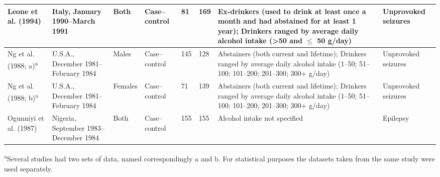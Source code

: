 \documentclass{article}
\begin{document}
\begin{table}
\begin{threeparttable}
\begin{tabular}{|p{2.5cm}|p{3cm}|p{1.5cm}|p{2cm}|p{1cm}|p{1cm}|p{7.5cm}|p{2cm}|}
    Leone et al. (1994) & Italy, January 1990--March 1991 & Both & Case--control & 81 & 169 & Ex-drinkers (used to drink at least once a month and had abstained for at least 1 year); Drinkers ranged by average daily alcohol intake (>50 and $\leq$ 50 g/day) & Unprovoked seizures \\ \hline
    Ng et al. (1988; a)\textsuperscript{a} & U.S.A., December 1981--February 1984 & Males & Case--control & 145 & 128 & Abstainers (both current and lifetime); Drinkers ranged by average daily alcohol intake (1--50; 51--100; 101--200; 201--300; 300+ g/day) & Unprovoked seizures \\ \hline
    Ng et al. (1988; b)\textsuperscript{a} & U.S.A., December 1981--February 1984 & Females & Case--control & 71 & 139 & Abstainers (both current and lifetime); Drinkers ranged by average daily alcohol intake (1--50; 51--100; 101--200; 201--300; 300+ g/day) & Unprovoked seizures \\ \hline
    Ogunniyi et al. (1987) & Nigeria, September 1983--December 1984 & Both & Case--control & 155 & 155 & Alcohol intake not specified & Epilepsy \\ \hline
    \end{tabular}
    \begin{tablenotes}
    \item \textsuperscript{a}Several studies had two sets of data, named correspondingly a and b. For statistical purposes the datasets taken from the same study were used separately.
    \end{tablenotes}
    \end{threeparttable}
\end{table}

    \normalsize
\end{document}
